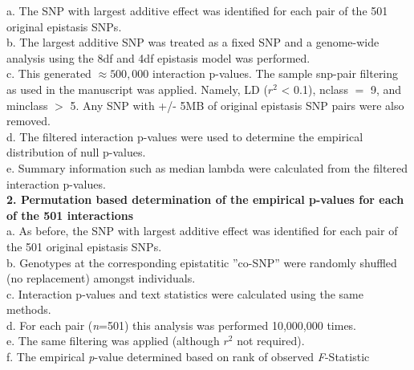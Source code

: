 \documentclass[paper=a4, fontsize=11pt]{scrartcl}         %
\numberwithin{equation}{section}                  %
\numberwithin{figure}{section}                    %
\numberwithin{table}{section}                   %
\begin{document}
a. The SNP with largest additive effect was identified for each pair of the 501 original epistasis SNPs. \\

b. The largest additive SNP was treated as a fixed SNP and a genome-wide analysis using the 8df and 4df epistasis model was performed. \\

c. This generated $\approx 500,000$ interaction p-values. The sample snp-pair filtering as used in the manuscript was applied. Namely, LD ($r^2$ < 0.1), nclass $=$ 9, and minclass $>$ 5. Any SNP with +/- 5MB of original epistasis SNP pairs were also removed. \\

d.  The filtered interaction p-values were used to determine the empirical distribution of null p-values. \\

e. Summary information such as median lambda were calculated from the filtered interaction p-values. \\

\textbf{2. Permutation based determination of the empirical p-values for each of the 501 interactions} \\

a. As before, the SNP with largest additive effect was identified for each pair of the 501 original epistasis SNPs. \\

b. Genotypes at the corresponding epistatitic ''co-SNP'' were randomly shuffled (no replacement) amongst individuals. \\

c. Interaction p-values and text statistics were calculated using the same methods. \\

d. For each pair (\emph{n}=501) this analysis was performed 10,000,000 times. \\

e. The same filtering was applied (although $r^2$ not required). \\

f. The empirical \emph{p}-value determined based on rank of observed \emph{F}-Statistic 

\newpage
\end{document}
